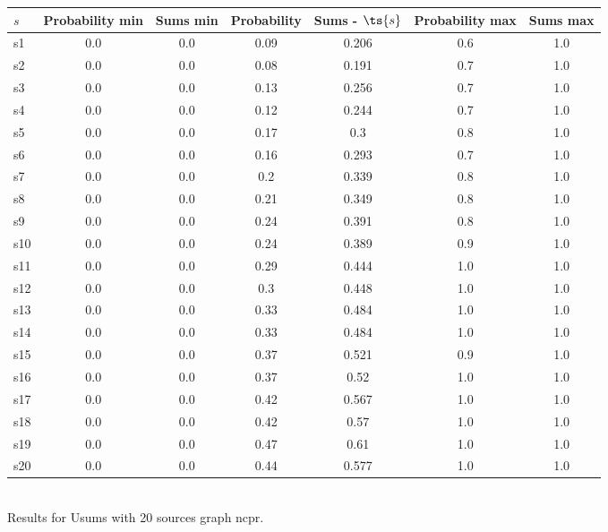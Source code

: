 \documentclass{article}
\begin{document}
\noindent\begin{tabular}{|l|c|c|c|c|c|c|}
\hline
$s$& Probability min & Sums min & Probability & Sums - $\ts{s}$ & Probability max & Sums max\\
\hline
s1 &0.0 & 0.0 & 0.09 & 0.206 & 0.6 & 1.0\\
\hline
s2 &0.0 & 0.0 & 0.08 & 0.191 & 0.7 & 1.0\\
\hline
s3 &0.0 & 0.0 & 0.13 & 0.256 & 0.7 & 1.0\\
\hline
s4 &0.0 & 0.0 & 0.12 & 0.244 & 0.7 & 1.0\\
\hline
s5 &0.0 & 0.0 & 0.17 & 0.3 & 0.8 & 1.0\\
\hline
s6 &0.0 & 0.0 & 0.16 & 0.293 & 0.7 & 1.0\\
\hline
s7 &0.0 & 0.0 & 0.2 & 0.339 & 0.8 & 1.0\\
\hline
s8 &0.0 & 0.0 & 0.21 & 0.349 & 0.8 & 1.0\\
\hline
s9 &0.0 & 0.0 & 0.24 & 0.391 & 0.8 & 1.0\\
\hline
s10 &0.0 & 0.0 & 0.24 & 0.389 & 0.9 & 1.0\\
\hline
s11 &0.0 & 0.0 & 0.29 & 0.444 & 1.0 & 1.0\\
\hline
s12 &0.0 & 0.0 & 0.3 & 0.448 & 1.0 & 1.0\\
\hline
s13 &0.0 & 0.0 & 0.33 & 0.484 & 1.0 & 1.0\\
\hline
s14 &0.0 & 0.0 & 0.33 & 0.484 & 1.0 & 1.0\\
\hline
s15 &0.0 & 0.0 & 0.37 & 0.521 & 0.9 & 1.0\\
\hline
s16 &0.0 & 0.0 & 0.37 & 0.52 & 1.0 & 1.0\\
\hline
s17 &0.0 & 0.0 & 0.42 & 0.567 & 1.0 & 1.0\\
\hline
s18 &0.0 & 0.0 & 0.42 & 0.57 & 1.0 & 1.0\\
\hline
s19 &0.0 & 0.0 & 0.47 & 0.61 & 1.0 & 1.0\\
\hline
s20 &0.0 & 0.0 & 0.44 & 0.577 & 1.0 & 1.0\\
\hline
\end{tabular}\\

\noindent Results for Usums with 20 sources graph ncpr.
\end{document}
